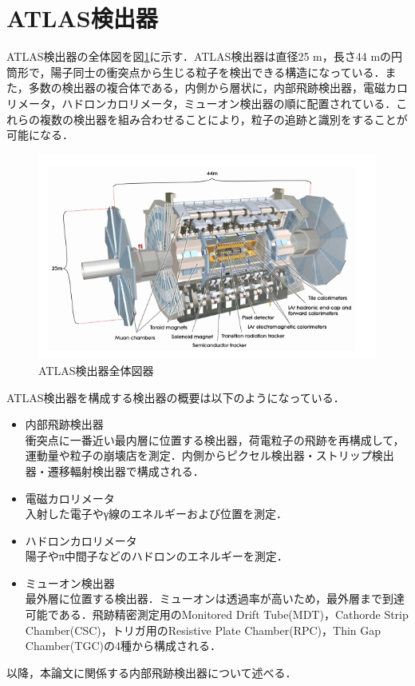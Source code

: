 \section{ATLAS検出器}
\label{sec:ATLAS}
ATLAS検出器の全体図を図\ref{fig:ATLAS}に示す．ATLAS検出器は直径25 $\mathrm{m}$，長さ44 $\mathrm{m}$の円筒形で，陽子同士の衝突点から生じる粒子を検出できる構造になっている．また，多数の検出器の複合体である，内側から層状に，内部飛跡検出器，電磁カロリメータ，ハドロンカロリメータ，ミューオン検出器の順に配置されている．これらの複数の検出器を組み合わせることにより，粒子の追跡と識別をすることが可能になる．\par
\begin{figure}
\centering
\includegraphics[width=12cm]{./figure/ATLAS.png}
\caption{ATLAS検出器全体図器\cite{Collaboration_2008}}
\label{fig:ATLAS}
\end{figure}

ATLAS検出器を構成する検出器の概要は以下のようになっている．\par
\begin{itemize}
\item 内部飛跡検出器\\
衝突点に一番近い最内層に位置する検出器，荷電粒子の飛跡を再構成して，運動量や粒子の崩壊店を測定．内側からピクセル検出器・ストリップ検出器・遷移輻射検出器で構成される．
\item 電磁カロリメータ\\
入射した電子やγ線のエネルギーおよび位置を測定．
\item ハドロンカロリメータ\\
陽子やπ中間子などのハドロンのエネルギーを測定．
\item ミューオン検出器\\
最外層に位置する検出器．ミューオンは透過率が高いため，最外層まで到達可能である．飛跡精密測定用のMonitored Drift Tube(MDT)，Cathorde Strip Chamber(CSC)，トリガ用のResistive Plate Chamber(RPC)，Thin Gap Chamber(TGC)の4種から構成される．
\end{itemize}
以降，本論文に関係する内部飛跡検出器について述べる．\par


